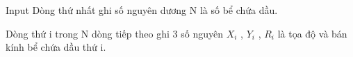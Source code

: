 Input
Dòng thứ nhất ghi số nguyên dương N là số bể chứa dầu.  

   Dòng thứ i trong N dòng tiếp theo ghi 3 số nguyên $X_{i}$   , $Y_{i}$   , $R_{i}$   là tọa độ và bán kính bể chứa dầu thứ i.